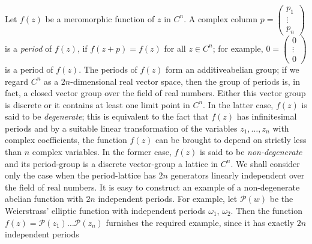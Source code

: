 Let $f(z)$ be a meromorphic function of $z$ in $C^{n}$. A complex
column
$p=\left(\begin{smallmatrix}p_{1}\\\vdots\\ p_{n}
\end{smallmatrix}\right)$ is a {\em period} of $f(z)$, if
$f(z+p)=f(z)$ for all $z\in C^{n}$; for example,
$0=\left(\begin{smallmatrix} 0\\ \vdots\\ 0
\end{smallmatrix}\right)$ is a period of $f(z)$. The periods of $f(z)$
form an additive\pageoriginale abelian group; if we regard $C^{n}$ as
a $2n$-dimensional real vector space, then the group of periods is, in
fact, a closed vector group over the field of real numbers. Either
this vector group is discrete or it contains at least one limit point
in $C^{n}$. In the latter case, $f(z)$ is said to be {\em degenerate};
this is equivalent to the fact that $f(z)$ has infinitesimal periods
and by a suitable linear transformation of the variables
$z_{1},\ldots,z_{n}$ with complex coefficients, the function $f(z)$
can be brought to depend on strictly less than $n$ complex
variables. In the former case, $f(z)$ is said to be {\em
  non-degenerate} and its period-group is a discrete vector-group \ie
a lattice in $C^{n}$. We shall consider only the case when the
period-lattice has $2n$ generators linearly independent over the field
of real numbers. It is easy to construct an example of a
non-degenerate abelian function with $2n$ independent periods. For
example, let $\mathscr{P}(w)$ be the Weierstrass' elliptic function
with independent periods $\omega_{1}$, $\omega_{2}$. Then the function
$f(z)=\mathscr{P}(z_{1})\ldots\mathscr{P}(z_{n})$ furnishes the
required example, since it has exactly $2n$ independent periods
